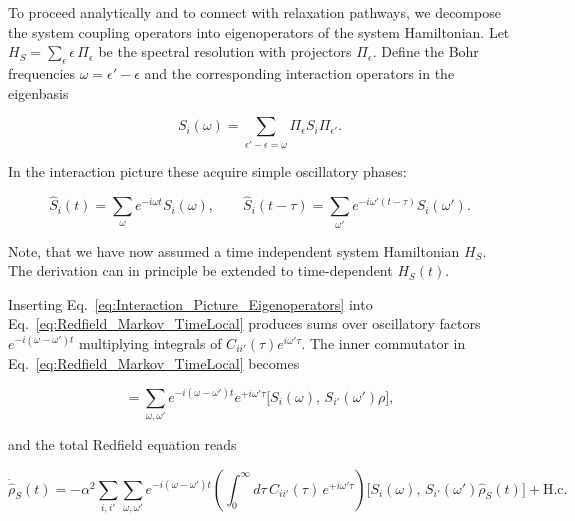 \noindent
To proceed analytically and to connect with relaxation pathways, we decompose the system coupling operators into eigenoperators of the system Hamiltonian. Let $H_S = \sum_{\epsilon} \epsilon \, \Pi_{\epsilon}$ be the spectral resolution with projectors $\Pi_{\epsilon}$. Define the Bohr frequencies $\omega = \epsilon' - \epsilon$ and the corresponding interaction operators in the eigenbasis

\begin{equation}
	S_i(\omega) = \sum_{\epsilon' - \epsilon = \omega} \Pi_{\epsilon} S_i \Pi_{\epsilon'}.
	\label{eq:Eigenoperator_Decomposition}
\end{equation}

\noindent
In the interaction picture these acquire simple oscillatory phases:

\begin{equation}
	\hat{S}_i(t) = \sum_{\omega} e^{-i \omega t} S_i(\omega), \qquad \hat{S}_i(t-\tau) = \sum_{\omega'} e^{-i \omega'(t-\tau)} S_i(\omega').
	\label{eq:Interaction_Picture_Eigenoperators}
\end{equation}

\noindent
Note, that we have now assumed a time independent system Hamiltonian $H_S$. The derivation can in principle be extended to time-dependent $H_S(t)$. 

\noindent
Inserting Eq.~\eqref{eq:Interaction_Picture_Eigenoperators} into Eq.~\eqref{eq:Redfield_Markov_TimeLocal} produces sums over oscillatory factors $e^{-i(\omega - \omega') t}$ multiplying integrals of $C_{ii'}(\tau) e^{i \omega' \tau}$. The inner commutator in Eq.~\eqref{eq:Redfield_Markov_TimeLocal} becomes

\begin{equation}
[\hat{S}_i(t),\, \hat{S}_{i'}(t-\tau)\rho]
= \sum_{\omega,\omega'} e^{-i(\omega - \omega')t} e^{+i \omega' \tau}
\big[ S_i(\omega),\, S_{i'}(\omega') \rho \big],
\tag{3}
\end{equation}

\noindent
and the total Redfield equation reads

\begin{equation}
	\dot{\hat{\rho}}_S(t) = -\alpha^2 \sum_{i,i'} \sum_{\omega,\omega'} e^{-i(\omega - \omega')t}
	\left( \int_0^{\infty} d\tau\, C_{ii'}(\tau)\, e^{+i \omega' \tau} \right)
	\big[ S_i(\omega),\, S_{i'}(\omega') \hat{\rho}_S(t) \big]
	+ \text{H.c.}
	\label{eq:Redfield_Frequency_Decomposed}
\end{equation}

